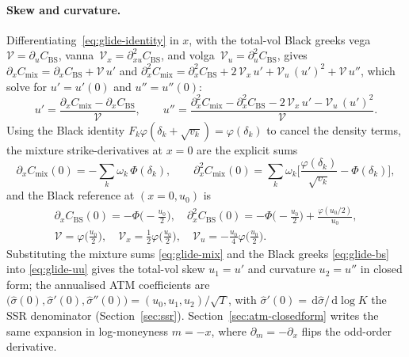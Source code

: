 \documentclass[11pt]{article}
\newcommand{\dd}{\,\mathrm{d}}
\begin{document}
\paragraph{Skew and curvature.} Differentiating~\eqref{eq:glide-identity} in $x$, with the
total-vol Black greeks vega~$\mathcal V=\partial_u C_{\mathrm{BS}}$,
vanna~$\mathcal V_x=\partial^2_{xu}C_{\mathrm{BS}}$, and volga~$\mathcal V_u=\partial^2_{u}C_{\mathrm{BS}}$,
gives $\partial_x C_{\mathrm{mix}}=\partial_x C_{\mathrm{BS}}+\mathcal V\,u'$ and
$\partial^2_x C_{\mathrm{mix}}=\partial^2_x C_{\mathrm{BS}}+2\,\mathcal V_x\,u'+\mathcal V_u\,(u')^2+\mathcal V\,u''$,
which solve for $u'=u'(0)$ and $u''=u''(0)$:
\begin{equation}
u'=\frac{\partial_x C_{\mathrm{mix}}-\partial_x C_{\mathrm{BS}}}{\mathcal V},\qquad
u''=\frac{\partial^2_x C_{\mathrm{mix}}-\partial^2_x C_{\mathrm{BS}}
   -2\,\mathcal V_x\,u'-\mathcal V_u\,(u')^2}{\mathcal V}.
\label{eq:glide-uu}
\end{equation}
Using the Black identity $F_k\varphi(\delta_k+\sqrt{v_k})=\varphi(\delta_k)$ to cancel the
density terms, the mixture strike-derivatives at $x=0$ are the explicit sums
\begin{equation}
\partial_x C_{\mathrm{mix}}(0)=-\sum_k\omega_k\,\Phi(\delta_k),\qquad
\partial^2_x C_{\mathrm{mix}}(0)=\sum_k\omega_k\Big[\frac{\varphi(\delta_k)}{\sqrt{v_k}}-\Phi(\delta_k)\Big],
\label{eq:glide-mix}
\end{equation}
and the Black reference at $(x{=}0,u_0)$ is
\begin{equation}
\begin{gathered}
\partial_x C_{\mathrm{BS}}(0)=-\Phi\!\big({-}\tfrac{u_0}{2}\big),\quad
\partial^2_x C_{\mathrm{BS}}(0)=-\Phi\!\big({-}\tfrac{u_0}{2}\big)+\frac{\varphi(u_0/2)}{u_0},\\
\mathcal V=\varphi\!\big(\tfrac{u_0}{2}\big),\quad
\mathcal V_x=\tfrac12\varphi\!\big(\tfrac{u_0}{2}\big),\quad
\mathcal V_u=-\tfrac{u_0}{4}\varphi\!\big(\tfrac{u_0}{2}\big).
\end{gathered}
\label{eq:glide-bs}
\end{equation}
Substituting the mixture sums \eqref{eq:glide-mix} and the Black greeks \eqref{eq:glide-bs} into \eqref{eq:glide-uu} gives the
total-vol skew $u_1=u'$ and curvature $u_2=u''$ in closed form; the annualised ATM coefficients
are $\big(\widehat\sigma(0),\widehat\sigma'(0),\widehat\sigma''(0)\big)=(u_0,u_1,u_2)/\sqrt{T}$,
with $\widehat\sigma'(0)=\dd\widehat\sigma/\dd\log K$ the SSR denominator
(Section~\ref{sec:ssr}). Section~\ref{sec:atm-closedform} writes the same expansion in
log-moneyness $m=-x$, where $\partial_m=-\partial_x$ flips the odd-order derivative.
\end{document}
